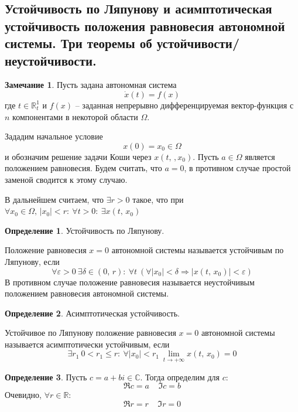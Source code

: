 \documentclass[a4paper,12pt]{article}
\renewcommand{\leq}{\ensuremath{\leqslant}}
\theoremstyle{plain}
\theoremstyle{definition}
\newtheorem{definition}{Определение}[section]
\newtheorem*{note}{Замечание}
\theoremstyle{remark}
\begin{document}
\subsection{Устойчивость по Ляпунову и асимптотическая устойчивость положения равновесия автономной системы. Три теоремы об устойчивости/неустойчивости.}
\begin{note}
	Пусть задана автономная система
	\[\dot{x}(t) = f(x)\]
	где $t \in \mathbb{R}^1_t$ и $f(x)$ -- заданная непрерывно дифференцируемая вектор-функция с $n$ компонентами в некоторой области $\Omega$.

	Зададим начальное условие
	\[x(0) = x_0 \in \Omega\]
	и обозначим решение задачи Коши через $x(t,\,,x_0)$. Пусть $a \in \Omega$ является положением равновесия. Будем считать, что $a  = 0$, в противном случае простой заменой сводится к этому случаю.

	В дальнейшем считаем, что $\exists r > 0$ такое, что при $\forall x_0 \in \Omega,\, |x_0| < r :\: \forall t > 0 :\: \exists x(t,\, x_0)$
\end{note}

\begin{definition}
	Устойчивость по Ляпунову.

	Положение равновесия $x = 0$ автономной системы называется устойчивым по Ляпунову, если
	\[\forall \varepsilon > 0 \: \exists \delta \in (0,\, r) :\: \forall t\:(\forall|x_0| < \delta \Rightarrow |x(t,\, x_0)| < \varepsilon)\]
	В противном случае положение равновесия называется неустойчивым положением равновесия автономной системы.
\end{definition}

\begin{definition}
	Асимптотическая устойчивость.

	Устойчивое по Ляпунову положение равновесия $x = 0$ автономной системы называется асимптотически устойчивым, если
	\[\exists r_1\: 0 < r_1 \leq r:\: \forall |x_0| < r_1 \: \lim_{t \to +\infty} x(t,\, x_0) = 0\]
\end{definition}

\begin{definition}
	Пусть $c = a + bi \in \mathbb{C}$. Тогда определим для $c$:
	\[\Re c = a \;\;\;\; \Im c = b \]
	Очевидно, $\forall r \in \mathbb{R}$:
	\[\Re r = r \;\;\;\; \Im r = 0\]
\end{definition}
\end{document}
